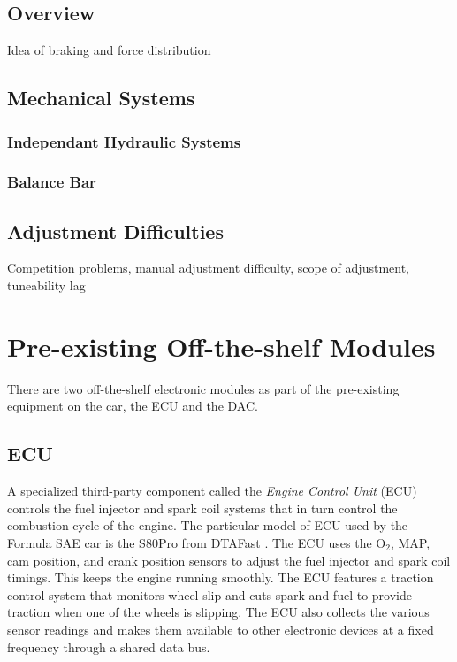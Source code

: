 \subsection{Overview}

Idea of braking and force distribution


\subsection{Mechanical Systems}


\subsubsection{Independant Hydraulic Systems}


\subsubsection{Balance Bar}


\subsection{Adjustment Difficulties}

Competition problems, manual adjustment difficulty, scope of adjustment,
tuneability lag

\section{Pre-existing Off-the-shelf Modules}

There are two off-the-shelf electronic modules as part of the pre-existing equipment on the car, the ECU and the DAC.

\subsection{ECU}

A specialized third-party component called the \emph{Engine Control Unit} (ECU) controls the fuel injector and spark coil systems that in turn control the combustion cycle of the engine. The particular model of ECU used by the Formula SAE car is the S80Pro from DTAFast \cite{s80pro}. The ECU uses the O$_{2}$, MAP, cam position, and crank position sensors to adjust the fuel injector and spark coil timings. This keeps the engine running smoothly. The ECU features a traction control system that monitors wheel slip and cuts spark and fuel to provide traction when one of the wheels is slipping. The ECU also collects the various sensor readings and makes them available to other electronic devices at a fixed frequency through a shared data bus. 

